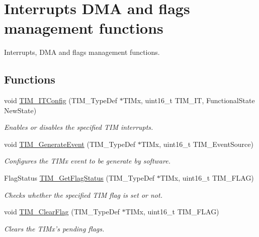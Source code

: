 \hypertarget{group___t_i_m___group5}{\section{Interrupts D\-M\-A and flags management functions}
\label{group___t_i_m___group5}
}


Interrupts, D\-M\-A and flags management functions.  


\subsection*{Functions}
\begin{DoxyCompactItemize}
\item 
void \hyperlink{group___t_i_m___group5_ga70e3d6c09d55ee69002e154c85cd40e4}{T\-I\-M\-\_\-\-I\-T\-Config} (T\-I\-M\-\_\-\-Type\-Def $\ast$T\-I\-Mx, uint16\-\_\-t T\-I\-M\-\_\-\-I\-T, Functional\-State New\-State)
\begin{DoxyCompactList}\small\item\em Enables or disables the specified T\-I\-M interrupts. \end{DoxyCompactList}\item 
void \hyperlink{group___t_i_m___group5_ga38bd4ffda920dd4f7655a0a2c6100a6e}{T\-I\-M\-\_\-\-Generate\-Event} (T\-I\-M\-\_\-\-Type\-Def $\ast$T\-I\-Mx, uint16\-\_\-t T\-I\-M\-\_\-\-Event\-Source)
\begin{DoxyCompactList}\small\item\em Configures the T\-I\-Mx event to be generate by software. \end{DoxyCompactList}\item 
Flag\-Status \hyperlink{group___t_i_m___group5_ga0adcbbd5e838ec8642e7a9b80075f41f}{T\-I\-M\-\_\-\-Get\-Flag\-Status} (T\-I\-M\-\_\-\-Type\-Def $\ast$T\-I\-Mx, uint16\-\_\-t T\-I\-M\-\_\-\-F\-L\-A\-G)
\begin{DoxyCompactList}\small\item\em Checks whether the specified T\-I\-M flag is set or not. \end{DoxyCompactList}\item 
void \hyperlink{group___t_i_m___group5_ga46568c7b254941dc53e785342d60baf3}{T\-I\-M\-\_\-\-Clear\-Flag} (T\-I\-M\-\_\-\-Type\-Def $\ast$T\-I\-Mx, uint16\-\_\-t T\-I\-M\-\_\-\-F\-L\-A\-G)
\begin{DoxyCompactList}\small\item\em Clears the T\-I\-Mx's pending flags. \end{DoxyCompactList}\item 

\end{DoxyCompactItemize}
